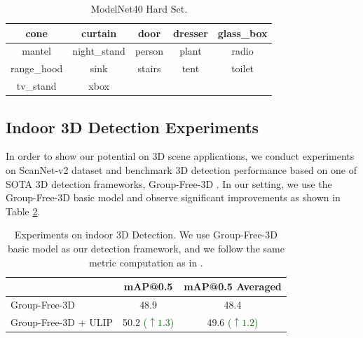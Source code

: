 \documentclass[10pt,twocolumn,letterpaper]{article}
\begin{document}
\begin{table}[htb]
    \small
    \begin{tabular}{ccccc}
        \toprule
        cone& curtain& door& dresser& glass\_box \\
        \midrule
        mantel& night\_stand& person& plant& radio \\
        \midrule
        range\_hood& sink& stairs& tent& toilet \\
        \midrule
        tv\_stand& xbox \\
        \bottomrule
    \end{tabular}
    \caption{ModelNet40 Hard Set.}
    \label{tab:ModelNet40-Hard-Set}
\end{table}


\subsection{Indoor 3D Detection Experiments}
In order to show our potential on 3D scene applications, we conduct experiments on ScanNet-v2 dataset and benchmark 3D detection performance based on one of SOTA 3D detection frameworks, Group-Free-3D \cite{liu2021group}. In our setting, we use the Group-Free-3D basic model and observe significant improvements as shown in Table \ref{tab:GroupFree3D experiments}.

\begin{table}[htb]
    \small
    \centering
    \begin{tabular}{lcc}
         \toprule
         ~ & mAP@0.5 & mAP@0.5 Averaged
         \\
         \midrule
         Group-Free-3D & 48.9 & 48.4\\
         \midrule
         Group-Free-3D + ULIP & 50.2 \textcolor{DarkGreen}{\small ($\uparrow 1.3$)} & 49.6 \textcolor{DarkGreen}{\small ($\uparrow 1.2$)}\\
         \bottomrule
    \end{tabular}
    \caption{Experiments on indoor 3D Detection. We use Group-Free-3D basic model as our detection framework, and we follow the same metric computation as in \cite{liu2021group}.}
    \label{tab:GroupFree3D experiments}
\end{table}
\end{document}
